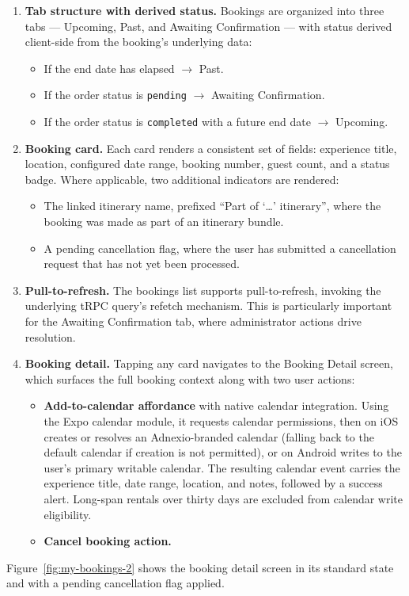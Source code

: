 \begin{enumerate}
  \item \textbf{Tab structure with derived status.} Bookings are organized into three tabs --- Upcoming, Past, and Awaiting Confirmation --- with status derived client-side from the booking's underlying data:
    \begin{itemize}
      \item If the end date has elapsed $\rightarrow$ Past.
      \item If the order status is \texttt{pending} $\rightarrow$ Awaiting Confirmation.
      \item If the order status is \texttt{completed} with a future end date $\rightarrow$ Upcoming.
    \end{itemize}

  \item \textbf{Booking card.} Each card renders a consistent set of fields: experience title, location, configured date range, booking number, guest count, and a status badge. Where applicable, two additional indicators are rendered:
    \begin{itemize}
      \item The linked itinerary name, prefixed ``Part of `\ldots' itinerary'', where the booking was made as part of an itinerary bundle.
      \item A pending cancellation flag, where the user has submitted a cancellation request that has not yet been processed.
    \end{itemize}

  \item \textbf{Pull-to-refresh.} The bookings list supports pull-to-refresh, invoking the underlying tRPC query's refetch mechanism. This is particularly important for the Awaiting Confirmation tab, where administrator actions drive resolution.

  \item \textbf{Booking detail.} Tapping any card navigates to the Booking Detail screen, which surfaces the full booking context along with two user actions:
    \begin{itemize}
      \item \textbf{Add-to-calendar affordance} with native calendar integration. Using the Expo calendar module, it requests calendar permissions, then on iOS creates or resolves an Adnexio-branded calendar (falling back to the default calendar if creation is not permitted), or on Android writes to the user's primary writable calendar. The resulting calendar event carries the experience title, date range, location, and notes, followed by a success alert. Long-span rentals over thirty days are excluded from calendar write eligibility.
      \item \textbf{Cancel booking action.}
    \end{itemize}
\end{enumerate}
Figure~\ref{fig:my-bookings-2} shows the booking detail screen in its standard state and with a pending cancellation flag applied.

